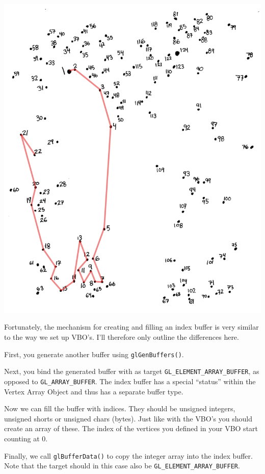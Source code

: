 \centerline{\includegraphics[scale=0.3]{images/Connect_the_dots_puzzle_(partially_solved).png}}

Fortunately, the mechanism for creating and filling an index buffer is very similar to the way we set up VBO's. I'll therefore only outline the differences here.

First, you generate another buffer using \texttt{glGenBuffers()}.

Next, you bind the generated buffer with as target \texttt{GL_ELEMENT_ARRAY_BUFFER}, as opposed to \texttt{GL_ARRAY_BUFFER}. The index buffer has a special ``status'' within the Vertex Array Object and thus has a separate buffer type.

Now we can fill the buffer with indices. They should be unsigned integers, unsigned shorts or unsigned chars (bytes). Just like with the VBO's you should create an array of these. The index of the vertices you defined in your VBO start counting at 0.

Finally, we call \texttt{glBufferData()} to copy the integer array into the index buffer. Note that the target should in this case also be \texttt{GL_ELEMENT_ARRAY_BUFFER}.


